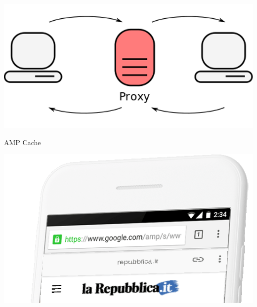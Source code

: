 \documentclass[graphic, aspectratio=169]{beamer}
\begin{document}

\begin{frame}
\noindent\begin{minipage}{.45\textwidth}
    
\end{minipage}\hfill
\begin{minipage}{.45\textwidth}
    
\end{minipage}
\end{frame}

{\includegraphics[width=\paperwidth,height=\paperheight]{images/proxy.png}}
\begin{frame}{AMP Cache}
\end{frame}

{\href{https://search.google.com/test/amp?view=search-preview&id=srqIZ15g1kFY89ACklbuMA}{\includegraphics[width=\paperwidth]{slides/images/repubblica_phone.png}}}
\begin{frame}
\end{frame}
\end{document}
